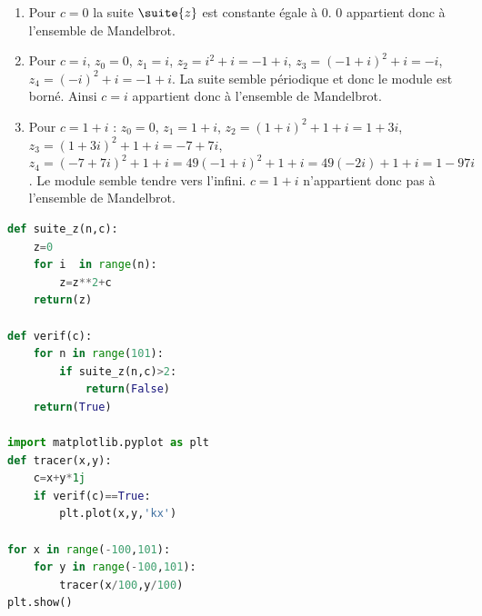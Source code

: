 \begin{correction}
\begin{enumerate}
\item Pour $c=0$ la suite $\suite{z}$ est constante égale à $0$. $0$ appartient donc à l'ensemble de Mandelbrot. 
\item Pour $c=i$, $z_0=0$, $z_1=i$, $z_2= i^2+i=-1+i$, $z_3= (-1+i)^2 +i = -i$, $z_4=(-i)^2+i = -1+i$. La suite semble périodique et donc le module est borné. Ainsi $c=i$  appartient donc à l'ensemble de Mandelbrot. 

\item Pour $c=1+i$ : $z_0=0$, $z_1=1+i$, $z_2=(1+i)^2+1+i=1+3i$, $z_3= (1+3i)^2 +1+i = -7+7i$, $z_4=(-7+7i)^2+1+i= 49(-1+i)^2+1+i = 49(-2i) +1+i = 1-97i$. Le module semble tendre vers l'infini. 
$c=1+i$ n'appartient donc pas à l'ensemble de Mandelbrot. 


\end{enumerate}
\begin{lstlisting}[language=Python]
def suite_z(n,c):
    z=0
    for i  in range(n):
        z=z**2+c
    return(z)

def verif(c):
    for n in range(101):
        if suite_z(n,c)>2:
            return(False)
    return(True)

import matplotlib.pyplot as plt
def tracer(x,y):
    c=x+y*1j
    if verif(c)==True:
        plt.plot(x,y,'kx')

for x in range(-100,101):
    for y in range(-100,101):
        tracer(x/100,y/100)
plt.show()

\end{lstlisting}

\end{correction}